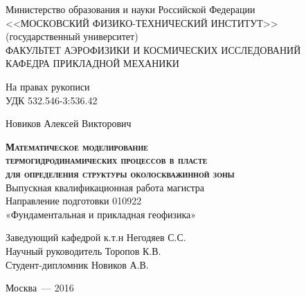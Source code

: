 \begin{titlepage}
\newpage

\begin{center}
	Министерство образования и науки Российской Федерации \\
	<<МОСКОВСКИЙ ФИЗИКО-ТЕХНИЧЕСКИЙ ИНСТИТУТ>>\\(государственный университет)\\[0.5cm]
	ФАКУЛЬТЕТ АЭРОФИЗИКИ И КОСМИЧЕСКИХ ИССЛЕДОВАНИЙ\\
	КАФЕДРА ПРИКЛАДНОЙ МЕХАНИКИ\\
\end{center}

\vspace{0.5em}

\begin{flushright}
На правах рукописи \\
УДК 532.546-3:536.42
\end{flushright}

\vspace{1em}

\begin{center}
	Новиков Алексей Викторович
\end{center}

\vspace{0.5em}

\begin{center}
	\textsc{\textbf{Математическое моделирование\\ 
		термогидродинамических процессов в пласте\\
		для определения структуры околоскважинной зоны}}\\[1cm]
	Выпускная квалификационная работа магистра\\
	Направление подготовки 010922\\
	«Фундаментальная и прикладная геофизика»\\
\end{center}

\vspace{2em}

\begin{flushleft}
	Заведующий кафедрой \hrulefill к.т.н Негодяев С.С.\\[0.5cm]
	Научный руководитель \hrulefill Торопов К.В.\\[0.5cm]
	Студент-дипломник \hrulefill Новиков А.В.\\
\end{flushleft}

\vspace{\fill}
\begin{center}
Москва~--- 2016
\end{center}

\end{titlepage}
